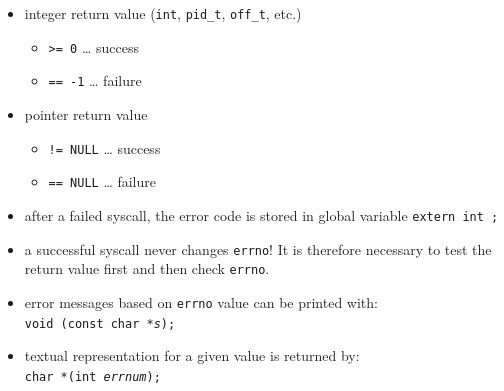 \begin{slide}
\setlength{\baselineskip}{0.8\baselineskip}
\begin{itemize}
\item integer return value (\texttt{int}, \texttt{pid\_t},
\texttt{off\_t}, etc.)
    \begin{itemize}
    \item \texttt{>= 0} \dots{} success
    \item \texttt{== -1} \dots{} failure
    \end{itemize}
\item pointer return value
    \begin{itemize}
    \item \texttt{!= NULL} \dots{} success
    \item \texttt{== NULL} \dots{} failure
    \end{itemize}
\item after a failed syscall, the error code is stored in global variable
\texttt{extern int ;}
\item a successful syscall never changes \texttt{errno}! It is therefore
necessary to test the return value first and then check \texttt{errno}.
\item error messages based on \texttt{errno} value can be printed with:\\
\texttt{void (const char *\emph{s});}
\item textual representation for a given value is returned by:\\
\texttt{char *(int \emph{errnum});}
\end{itemize}
\end{slide}


